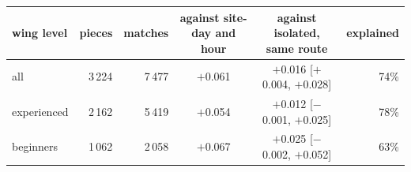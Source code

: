 \begin{tabular}{@{}l r r c c r@{}}
\toprule
wing level & pieces & matches & against site-day and hour & against isolated, same route & explained \\
\midrule
all & 3\,224 & 7\,477 & $+$0.061 & $+$0.016 [$+$0.004, $+$0.028] & 74\% \\
experienced & 2\,162 & 5\,419 & $+$0.054 & $+$0.012 [$-$0.001, $+$0.025] & 78\% \\
beginners & 1\,062 & 2\,058 & $+$0.067 & $+$0.025 [$-$0.002, $+$0.052] & 63\% \\
\bottomrule
\end{tabular}
